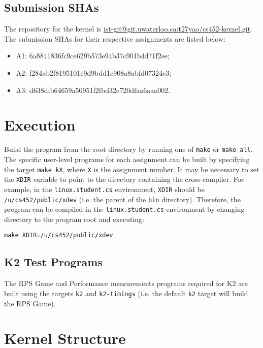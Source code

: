 \documentclass[12pt, titlepage]{article}
\begin{document}
    \subsection{Submission SHAs}

    The repository for the kernel is \href{https://git.uwaterloo.ca/t27yao/cs452-kernel}{ist-git@git.uwaterloo.ca:t27yao/cs452-kernel.git}. The submission SHAs for their respective assignments are listed below:
    \begin{itemize}
        \item A1: 6a8841836fc9ce629b573e94b37c901b4d71f2ee;
        \item A2: f284ab2f8195101c9d9bdd1c908a8abfd07324c3;
        \item A3: d638dfb64659a50951f2fbd32e720dfaa6aaa002.
    \end{itemize}

    \section{Execution}

    Build the program from the root directory by running one of \verb`make` or \verb`make all`. The specific user-level programs for each assignment can be built by specifying the target \verb`make kX`, where \verb`X` is the assignment number. It may be necessary to set the \verb`XDIR` variable to point to the directory containing the cross-compiler. For example, in the \verb`linux.student.cs` environment, \verb`XDIR` should be \verb`/u/cs452/public/xdev` (i.e. the parent of the \verb`bin` directory). Therefore, the program can be compiled in the \verb`linux.student.cs` environment by changing directory to the program root and executing:
    \begin{verbatim}
make XDIR=/u/cs452/public/xdev
    \end{verbatim}

    \subsection{K2 Test Programs}
    The RPS Game and Performance measurements programs required for K2 are built using the targets \verb`k2` and \verb`k2-timings` (i.e. the default \verb`k2` target will build the RPS Game).

    \section{Kernel Structure}
\end{document}
